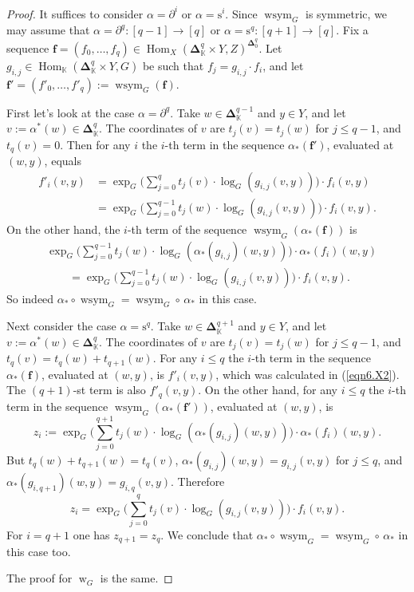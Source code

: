 \documentclass[10pt]{amsart}
\theoremstyle{definition}
\numberwithin{equation}{section}
\newcommand{\opn}{\operatorname}
\newcommand{\mrm}[1]{\mathrm{#1}}
\newcommand{\mbb}[1]{\mathbb{#1}}
\newcommand{\bsym}[1]{\boldsymbol{#1}}
\newcommand{\K}{\mbb{K}}
\begin{document}
\begin{proof}
It suffices to consider $\alpha = \partial^i$ or 
$\alpha = \mrm{s}^i$. Since $\opn{wsym}_G$ is symmetric,
we may assume that 
$\alpha = \partial^q : [q-1] \to [q]$ or
$\alpha = \mrm{s}^q : [q+1] \to [q]$.
Fix a sequence
$\bsym{f} = (f_0, \ldots, f_q) \in 
\opn{Hom}_X(\bsym{\Delta}^q_{\K} \times Y, Z)
^{\bsym{\Delta}^q_{0}}$.
Let $g_{i,j} \in \opn{Hom}_{\K}(\bsym{\Delta}^q_{\K} \times Y, G)$
be such that
$f_{j} = g_{i,j} \cdot f_i$,
and let
$\bsym{f}' = (f'_0, \ldots, f'_q) :=  
\opn{wsym}_G(\bsym{f})$. 

First let's look at the case $\alpha = \partial^q$. 
Take $w \in \bsym{\Delta}^{q-1}_{\K}$ and
$y \in Y$, and let $v := \alpha^*(w) \in \bsym{\Delta}^q_{\K}$.
The coordinates of $v$ are
$t_j(v) = t_j(w)$ for $j \leq q-1$, and $t_q(v) = 0$.
Then for any $i$ the $i$-th term in the sequence
$\alpha_*(\bsym{f}')$, evaluated at $(w,y)$, equals
\begin{equation} \label{eqn6.X2}
\begin{aligned}
f'_i(v,y) & =
\opn{exp}_G \Big( \sum_{j=0}^q t_j(v) \cdot
\opn{log}_G(g_{i, j}(v, y)) \Big) \cdot f_i(v, y) \\
& = \opn{exp}_G \Big( \sum_{j=0}^{q-1} t_j(w) \cdot
\opn{log}_G(g_{i, j}(v, y)) \Big) \cdot f_i(v, y) .
\end{aligned}
\end{equation}
On the other hand, the $i$-th term of the 
sequence $\opn{wsym}_G(\alpha_*(\bsym{f}))$ is
\[ \begin{aligned}
& \opn{exp}_G \Big( \sum_{j=0}^{q-1} t_j(w) \cdot
\opn{log}_G( \alpha_*(g_{i, j})(w, y)) \Big) \cdot 
\alpha_*(f_i)(w, y) \\
& \qquad = \opn{exp}_G \Big( \sum_{j=0}^{q-1} t_j(w) \cdot
\opn{log}_G( g_{i, j}(v, y)) \Big) \cdot f_i(v, y) .
\end{aligned} \]
So indeed
$\alpha_* \circ \opn{wsym}_G = \opn{wsym}_G \circ\, \alpha_*$ in 
this case.

Next consider the case $\alpha = \mrm{s}^q$. Take
$w \in \bsym{\Delta}^{q+1}_{\K}$ and
$y \in Y$, and let $v := \alpha^*(w) \in \bsym{\Delta}^q_{\K}$.
The coordinates of $v$ are
$t_j(v) = t_j(w)$ for $j \leq q-1$, and 
$t_q(v) = t_q(w) + t_{q+1}(w)$.
For any $i \leq q$ the $i$-th term in the sequence 
$\alpha_*(\bsym{f})$, evaluated at $(w,y)$, is
$f'_i(v,y)$, which was calculated in (\ref{eqn6.X2}). 
The $(q+1)$-st term is also $f'_q(v,y)$.
On the other hand, 
for any $i \leq q$ the $i$-th term in the sequence 
$\opn{wsym}_G(\alpha_*(\bsym{f}'))$, evaluated at $(w,y)$, is
\[ z_i := \opn{exp}_G \Big( \sum_{j=0}^{q+1} t_j(w) \cdot
\opn{log}_G( \alpha_*(g_{i, j})(w, y)) \Big) \cdot 
\alpha_*(f_i)(w, y) . \]
But 
$t_q(w) + t_{q+1}(w) = t_q(v)$, 
$\alpha_*(g_{i,j})(w,y) = g_{i,j}(v,y)$ for $j \leq q$, and
\linebreak $\alpha_*(g_{i, q+1})(w, y) = g_{i, q}(v, y)$.
Therefore
\[ z_i = \opn{exp}_G \Big( \sum_{j=0}^{q} t_j(v) \cdot
\opn{log}_G( g_{i, j}(v, y)) \Big) \cdot f_i(v, y) . \]
For $i = q+1$ one has $z_{q+1} = z_q$. We conclude that 
$\alpha_* \circ \opn{wsym}_G = \opn{wsym}_G \circ\, \alpha_*$ in 
this case too.

The proof for $\opn{w}_G$ is the same.
\end{proof}
\end{document}
